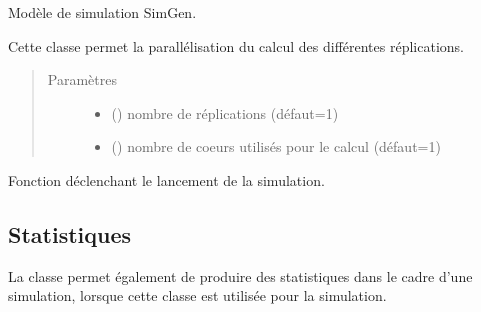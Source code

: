 \documentclass[letterpaper,10pt,french]{sphinxmanual}
\begin{document}
\begin{fulllineitems}
\label{\detokenize{code:simgen.replicate}}
Modèle de simulation SimGen.

Cette classe permet la parallélisation du calcul des différentes réplications.
\begin{quote}\begin{description}
\item[{Paramètres}] \leavevmode\begin{itemize}
\item {} 
 () \textendash{} nombre de réplications (défaut=1)

\item {} 
 () \textendash{} nombre de coeurs utilisés pour le calcul (défaut=1)

\end{itemize}

\end{description}\end{quote}

\begin{fulllineitems}
\label{\detokenize{code:simgen.replicate.simulate}}
Fonction déclenchant le lancement de la simulation.

\end{fulllineitems}


\end{fulllineitems}



\subsection{Statistiques}
\label{\detokenize{code:statistiques}}
La classe  permet également de produire des statistiques dans le cadre d’une simulation, lorsque cette classe est utilisée pour la simulation.
\end{document}
